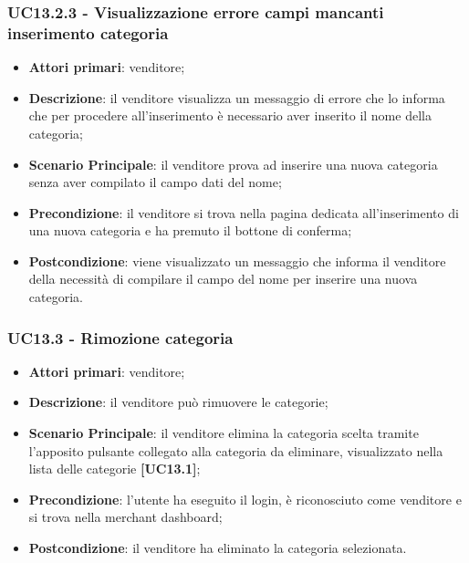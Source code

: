 \subsubsection{UC13.2.3 - Visualizzazione errore campi mancanti inserimento categoria}
\begin{itemize}
\item \textbf{Attori primari}: venditore;
\item \textbf{Descrizione}: il venditore visualizza un messaggio di errore che lo informa che per procedere all'inserimento è necessario aver inserito il nome della categoria;
\item \textbf{Scenario Principale}: il venditore prova ad inserire una nuova categoria senza aver compilato il campo dati del nome;
\item \textbf{Precondizione}: il venditore si trova nella pagina dedicata all'inserimento di una nuova categoria e ha premuto il bottone di conferma;
\item \textbf{Postcondizione}: viene visualizzato un messaggio che informa il venditore della necessità di compilare il campo del nome per inserire una nuova categoria.
\end{itemize}

\subsubsection{UC13.3 - Rimozione categoria}
\begin{itemize}
\item \textbf{Attori primari}: venditore;
\item \textbf{Descrizione}: il venditore può rimuovere le categorie;
\item \textbf{Scenario Principale}: il venditore elimina la categoria scelta tramite l'apposito pulsante collegato alla categoria da eliminare, visualizzato nella lista delle categorie \textbf{[UC13.1]};
\item \textbf{Precondizione}: l'utente ha eseguito il login, è riconosciuto come venditore e si trova nella merchant dashboard;
\item \textbf{Postcondizione}: il venditore ha eliminato la categoria selezionata.
\end{itemize}


